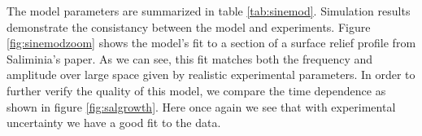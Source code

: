 \documentclass[aps, prl, twocolumn, groupedaddress]{revtex4-1}
\begin{document}
The model parameters are summarized in table
\ref{tab:sinemod}. Simulation results demonstrate the consistancy
between the model and experiments. Figure \ref{fig:sinemodzoom} shows
the model's fit to a section of a surface relief profile from
Saliminia's paper. As we can see, this fit matches both the frequency
and amplitude over large space given by realistic experimental
parameters. In order to further verify the quality of
this model, we compare the time dependence as shown in figure
\ref{fig:salgrowth}. Here once again we see that with experimental
uncertainty we have a good fit to the data.
\end{document}
